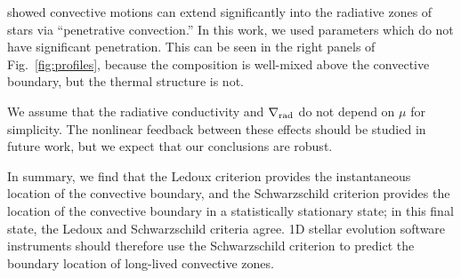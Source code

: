 \citet{anders_etal_2022} showed convective motions can extend significantly into the radiative zones of stars via ``penetrative convection.''
In this work, we used parameters which do not have significant penetration.
This can be seen in the right panels of Fig.~\ref{fig:profiles}, because the composition is well-mixed above the convective boundary, but the thermal structure is not.

We assume that the radiative conductivity and $\nabla_{\rm{rad}}$ do not depend on $\mu$ for simplicity.
The nonlinear feedback between these effects should be studied in future work, but we expect that our conclusions are robust.

In summary, we find that the Ledoux criterion provides the instantaneous location of the convective boundary, and the Schwarzschild criterion provides the location of the convective boundary in a statistically stationary state; in this final state, the Ledoux and Schwarzschild criteria agree.
1D stellar evolution software instruments should therefore use the Schwarzschild criterion to predict the boundary location of long-lived convective zones.
